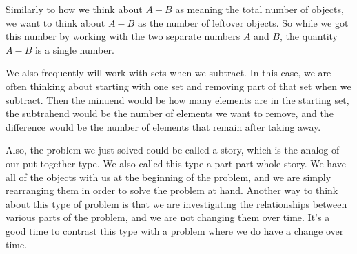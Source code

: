 \documentclass{ximera}
\begin{document}
Similarly to how we think about $A+B$ as meaning the total number of objects, we want to think about $A-B$ as the number of leftover objects. So while we got this number by working with the two separate numbers $A$ and $B$, the quantity $A-B$ is a single number. 

We also frequently will work with sets when we subtract. In this case, we are often thinking about starting with one set and removing part of that set when we subtract. Then the minuend would be how many elements are in the starting set, the subtrahend would be the number of elements we want to remove, and the difference would be the number of elements that remain after taking away.

Also, the problem we just solved could be called a  story, which is the analog of our put together type. We also called this type a part-part-whole story. We have all of the objects with us at the beginning of the problem, and we are simply rearranging them in order to solve the problem at hand.  Another way to think about this type of problem is that we are investigating the relationships between various parts of the problem, and we are not changing them over time.  It's a good time to contrast this type with a problem where we do have a change over time.
\end{document}
